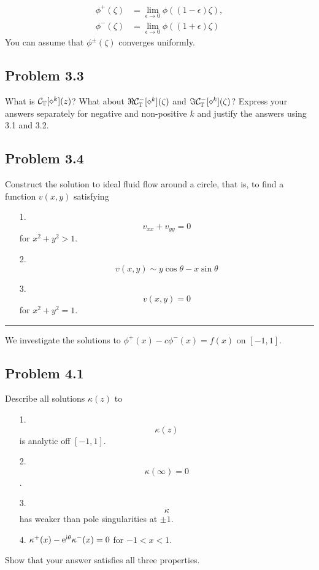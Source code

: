 \documentclass[12pt,a4paper]{article}
\def\I{ {\rm i} }
\def\E{ {\rm e} }
\def\CC{ {\cal C} }
\begin{document}
\begin{align*}
\phi^+(\zeta) & = \lim_{\epsilon \rightarrow 0} \phi((1-\epsilon) \zeta), \\
\phi^-(\zeta) & = \lim_{\epsilon \rightarrow 0} \phi((1+\epsilon) \zeta)
\end{align*}
You can assume that $\phi^\pm(\zeta)$ converges uniformly.

\subsection{Problem 3.3}
What is $\CC_{\Bbb T}[\diamond^k](z)$?  What about  $\Re \CC_{\Bbb T}^- [\diamond^k](\zeta)$ and $\Im \CC_{\Bbb T}^- [\diamond^k](\zeta)$? Express your answers separately for negative and non-positive $k$ and justify the answers using 3.1 and 3.2.

\subsection{Problem 3.4}
Construct the solution to ideal fluid flow around a circle, that is, to find a function $v(x,y)$ satisfying

\begin{itemize}
\item[1. ] \[
v_{xx} + v_{yy} = 0
\]
for $x^2 + y^2 > 1$.


\item[2. ] \[
v(x,y) \sim y \cos \theta  - x \sin \theta
\]

\item[3. ] \[
v(x,y) = 0
\]
for $x^2 + y^2 = 1$.

\end{itemize}
\rule{\textwidth}{1pt}
We investigate the solutions to  $\phi^+(x) - c \phi^-(x) = f(x)$ on $[-1,1]$.

\subsection{Problem 4.1}
Describe all solutions $\kappa(z)$ to

\begin{itemize}
\item[1. ] \[
\kappa(z)
\]
is analytic off $[-1,1]$.


\item[2. ] \[
\kappa(\infty) = 0
\]
.


\item[3. ] \[
\kappa
\]
has weaker than pole singularities at $\pm 1$.


\item[4. ] $\kappa^+(x) - \E^{\I \theta} \kappa^-(x) = 0$ for $-1 < x <1$.

\end{itemize}
Show that your answer satisfies all three properties.
\end{document}
